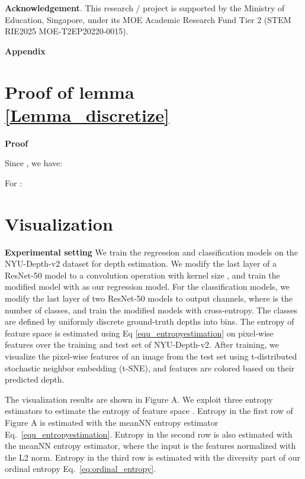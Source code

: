 \documentclass{article} \usepackage{iclr2023_conference,times}
\newenvironment*{proof}{\textbf{Proof}\quad}{\hfill \par\vspace{2pt}}
\begin{document}
\textbf{Acknowledgement}. This research / project is supported by the Ministry of Education, Singapore, under its MOE Academic Research Fund Tier 2 (STEM RIE2025 MOE-T2EP20220-0015).




\newpage

\renewcommand\thefigure{\Alph{figure}} 
\setcounter{figure}{0}

\textbf{Appendix}
\appendix
\section{Proof of lemma \ref{Lemma_discretize}}
\label{appendix_A}

\begin{proof}
    
Since , we have:

For :

\end{proof}


\section{Visualization}
\label{appendix_C}

\textbf{Experimental setting}
We train the regression and classification models on the NYU-Depth-v2 dataset for depth estimation. We modify the last layer of a ResNet-50 model to a convolution operation with kernel size , and train the modified model with  as our regression model. For the classification models, we modify the last layer of two ResNet-50 models to output  channels, where  is the number of classes, and train the modified models with cross-entropy. The classes are defined by uniformly discrete ground-truth depths into  bins. The entropy of feature space is estimated using Eq \ref{equ_entropyestimation} on pixel-wise features over the training and test set of NYU-Depth-v2. After training, we visualize the pixel-wise features of an image from the test set using t-distributed stochastic neighbor embedding (t-SNE), and features are colored based on their predicted depth. 

The visualization results are shown in Figure A. We exploit three entropy estimators to estimate the entropy of feature space . Entropy in the first row of Figure A is estimated with the meanNN entropy estimator Eq.~\ref{equ_entropyestimation}. Entropy in the second row is also estimated with the meanNN entropy estimator, where the input is the features normalized with the L2 norm. Entropy in the third row is estimated with the diversity part of our ordinal entropy Eq.~\ref{eq:ordinal_entropy}.
\end{document}
